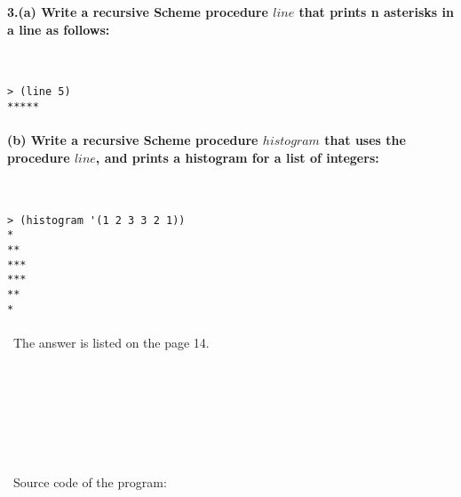 \documentclass{article}
\begin{document}
\paragraph{}\
\paragraph{}\

\paragraph{3.\quad (a) Write a recursive Scheme procedure \(line\) that prints n asterisks in a line as follows:}\

\begin{verbatim} 
> (line 5)
*****
\end{verbatim}

\paragraph{\qquad (b) Write a recursive Scheme procedure \(histogram\) that uses the procedure \(line\), and prints a histogram for a list of integers:}\

\begin{verbatim} 
> (histogram '(1 2 3 3 2 1))
*
**
***
***
**
*
\end{verbatim}
\paragraph{}\
		The answer is listed on the page 14.

\paragraph{}\
\paragraph{}\
\paragraph{}\
\paragraph{}\
Source code of the program:
\end{document}
